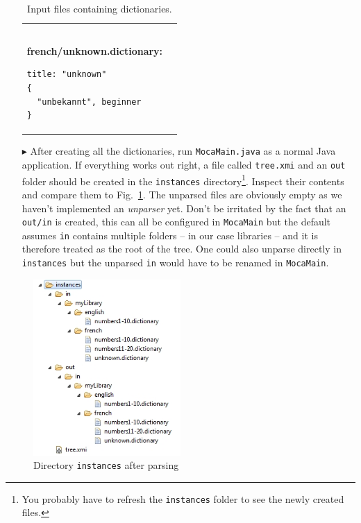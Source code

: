 \begin{enumerate}
\begin{table}
\begin{tabular}{p{6cm} p{6cm} }
\begin{verbatim}
\end{verbatim}
\textbf{french/unknown.dictionary:}
\begin{verbatim}
title: "unknown"
{
  "unbekannt", beginner
}
\end{verbatim}
  \\
\end{tabular}   
\caption{Input files containing dictionaries.}
\label{moca-inputdata}

\end{table}   

\item[$\blacktriangleright$] After creating all the dictionaries, run \texttt{MocaMain.java} as a normal Java application. 
If everything works out right, a file called \texttt{tree.xmi} and an \texttt{out} folder should be created in the \texttt{instances} directory\footnote{You probably have to refresh the \texttt{instances} folder to see the newly created files.}.  
Inspect their contents and compare them to Fig.~\ref{fig:moca-9-ParseResult1}. 
The unparsed files are obviously empty as we haven't implemented an \emph{unparser} yet.  
Don't be irritated by the fact that an \texttt{out/in} is created, this can all be configured in \texttt{MocaMain} but the default assumes \texttt{in} contains multiple folders -- in our case libraries -- and it is therefore treated as the root of the tree.  
One could also unparse directly in \texttt{instances} but the unparsed \texttt{in} would have to be renamed in \texttt{MocaMain}.
\end{enumerate}

\begin{figure}[!htbp]
\begin{center}
 \includegraphics[width=0.5\textwidth]{pics/moca/2TextToMocaTree/9-ParseResult1}
  \caption{Directory \texttt{instances} after parsing}
  \label{fig:moca-9-ParseResult1}
\end{center}
\end{figure} 

